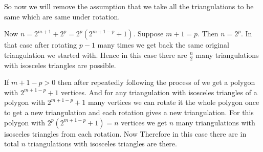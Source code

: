 \documentclass[a4paper, 11pt]{article}
\begin{document}
{\begin{itemize}[label=$\bullet$]
\begin{itemize}
So now we will remove the assumption that we take all the triangulations to be same which are same under rotation.

Now $n=2^{m+1}+2^p=2^p(2^{m+1-p}+1)$. Suppose $m+1=p$. Then $n=2^p$. In that case after rotating ${p-1}$ many times we get back the same original triangulation we started with. Hence in this case there are $\frac{n}2$ many triangulations with isosceles triangles are possible.

If $m+1-p>0$ then after repeatedly following the process of   we get a polygon with $2^{m+1-p}+1$ vertices. And for any triangulation with isosceles triangles of a polygon with  $2^{m+1-p}+1$ many vertices we can rotate it the whole polygon once to get a new triangulation and each rotation gives a new triangulation. For this polygon with $2^p(2^{m+1-p}+1)=n$ vertices we get $n$ many triangulations with isosceles triangles from each rotation. Now  Therefore in this case there are in total $n$ triangulations with isosceles triangles are there. 
\end{itemize}
\end{itemize}
}
\end{document}
